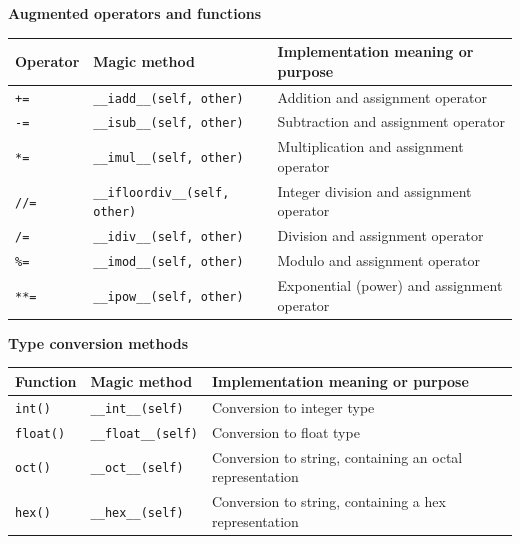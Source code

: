 \textbf{Augmented operators and functions}\\[0.1cm]
\begin{tabular}{|p{2cm}|p{5cm}|p{8cm}|}
\hline
\textbf{Operator} & \textbf{Magic method} & \textbf{Implementation meaning or purpose} \\
\hline
\texttt{+=} & \texttt{\_\_iadd\_\_(self, other)} & Addition and assignment operator \\
\texttt{-=} & \texttt{\_\_isub\_\_(self, other)} & Subtraction and assignment operator \\
\texttt{*=} & \texttt{\_\_imul\_\_(self, other)} & Multiplication and assignment operator \\
\texttt{//=} & \texttt{\_\_ifloordiv\_\_(self, other)} & Integer division and assignment operator \\
\texttt{/=} & \texttt{\_\_idiv\_\_(self, other)} & Division and assignment operator \\
\texttt{\%=} & \texttt{\_\_imod\_\_(self, other)} & Modulo and assignment operator \\
\texttt{**=} & \texttt{\_\_ipow\_\_(self, other)} & Exponential (power) and assignment operator \\
\hline
\end{tabular}
\vspace{0.5cm}

\newpage
\textbf{Type conversion methods}\\[0.1cm]
\begin{tabular}{|p{2cm}|p{4cm}|p{9cm}|}
\hline
\textbf{Function} & \textbf{Magic method} & \textbf{Implementation meaning or purpose} \\
\hline
\texttt{int()} & \texttt{\_\_int\_\_(self)} & Conversion to integer type \\
\texttt{float()} & \texttt{\_\_float\_\_(self)} & Conversion to float type \\
\texttt{oct()} & \texttt{\_\_oct\_\_(self)} & Conversion to string, containing an octal representation \\
\texttt{hex()} & \texttt{\_\_hex\_\_(self)} & Conversion to string, containing a hex representation \\
\hline
\end{tabular}

\vspace{0.5cm}

